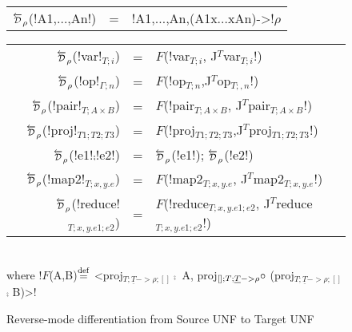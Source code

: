 \begin{figure*}[t]
    \begin{tabular}{r c l}
        $\Dsynrevsymbol_{\rho}$(!A1,$\ldots$,An!) &=& !A1,$\ldots$,An,(A1x$\ldots$xAn)->!$\rho$
    \end{tabular}

    \medskip
    \begin{tabular}{r c l}
    $\Dsynrevsymbol_{\rho}$(!var!$_{T;i}$) &=& $F$(!var$_{T;i}$, J$^T$var$_{T;i}$!) \\
    $\Dsynrevsymbol_{\rho}$(!op!$_{\Gamma;n}$) &=& $F$(!op$_{T;n}$,J$^T$op$_{T;,n}$!) \\ 
    $\Dsynrevsymbol_{\rho}$(!pair!$_{T;A\times B}$) &=& $F$(!pair$_{T;A\times B}$, J$^T$pair$_{T;A\times B}$!) \\
    $\Dsynrevsymbol_{\rho}$(!proj!$_{T1;T2;T3}$) &=& $F$(!proj$_{T1;T2;T3}$,J$^T$proj$_{T1;T2;T3}$!) \\
    $\Dsynrevsymbol_{\rho}$(!e1!$\comp$!e2!) &=& $\Dsynrevsymbol_{\rho}$(!e1!); $\Dsynrevsymbol_{\rho}$(!e2!)\\ 
    $\Dsynrevsymbol_{\rho}$(!map2!$_{T;x,y.e}$) &=& $F$(!map2$_{T;x,y.e}$, J$^T$map2$_{T;x,y.e}$!) \\
    $\Dsynrevsymbol_{\rho}$(!reduce!$_{T;x,y.e1;e2}$) &=& $F$(!reduce$_{T;x,y.e1;e2}$, J$^T$reduce$_{T;x,y.e1;e2}$!) \\
    \end{tabular}\\
    where !$F$(A,B)$\stackrel {\mathrm{def}}=$ <proj$_{T;\underline{T}->\rho;[]} \comp$ A, proj$_{[];T;\underline{T}->\rho} \circ$ (proj$_{T;\underline{T}->\rho;[]}$ $\comp$ B)>!
    \caption{Reverse-mode differentiation from Source UNF to Target UNF}
    \label{fig:diff_macro}    
\end{figure*}